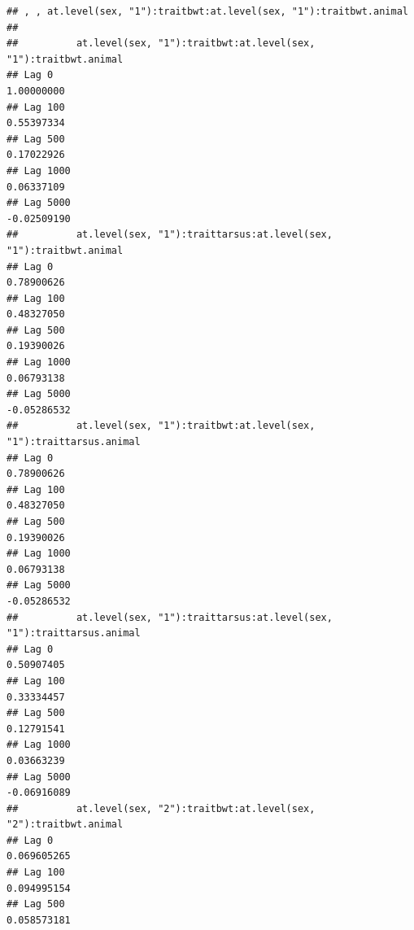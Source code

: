 \documentclass[
  12pt,
]{book}
\newenvironment{Shaded}{\begin{snugshade}}{\end{snugshade}}
\newcommand{\FloatTok}[1]{\textcolor[rgb]{0.00,0.00,0.81}{#1}}
\newcommand{\FunctionTok}[1]{\textcolor[rgb]{0.00,0.00,0.00}{#1}}
\newcommand{\NormalTok}[1]{#1}
\newcommand{\SpecialCharTok}[1]{\textcolor[rgb]{0.00,0.00,0.00}{#1}}
\begin{document}
\begin{Shaded}
\end{Shaded}

\begin{verbatim}
## , , at.level(sex, "1"):traitbwt:at.level(sex, "1"):traitbwt.animal
## 
##          at.level(sex, "1"):traitbwt:at.level(sex, "1"):traitbwt.animal
## Lag 0                                                        1.00000000
## Lag 100                                                      0.55397334
## Lag 500                                                      0.17022926
## Lag 1000                                                     0.06337109
## Lag 5000                                                    -0.02509190
##          at.level(sex, "1"):traittarsus:at.level(sex, "1"):traitbwt.animal
## Lag 0                                                           0.78900626
## Lag 100                                                         0.48327050
## Lag 500                                                         0.19390026
## Lag 1000                                                        0.06793138
## Lag 5000                                                       -0.05286532
##          at.level(sex, "1"):traitbwt:at.level(sex, "1"):traittarsus.animal
## Lag 0                                                           0.78900626
## Lag 100                                                         0.48327050
## Lag 500                                                         0.19390026
## Lag 1000                                                        0.06793138
## Lag 5000                                                       -0.05286532
##          at.level(sex, "1"):traittarsus:at.level(sex, "1"):traittarsus.animal
## Lag 0                                                              0.50907405
## Lag 100                                                            0.33334457
## Lag 500                                                            0.12791541
## Lag 1000                                                           0.03663239
## Lag 5000                                                          -0.06916089
##          at.level(sex, "2"):traitbwt:at.level(sex, "2"):traitbwt.animal
## Lag 0                                                       0.069605265
## Lag 100                                                     0.094995154
## Lag 500                                                     0.058573181

\end{verbatim}
\end{document}
